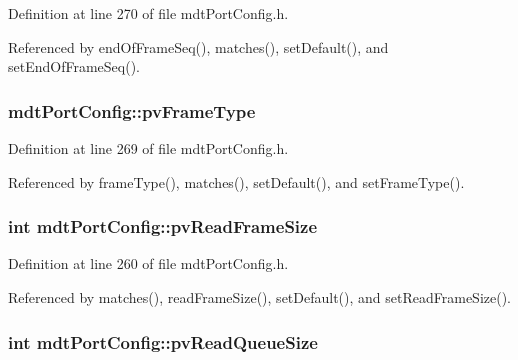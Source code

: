 Definition at line 270 of file mdt\-Port\-Config.\-h.



Referenced by end\-Of\-Frame\-Seq(), matches(), set\-Default(), and set\-End\-Of\-Frame\-Seq().

\hypertarget{classmdt_port_config_a4bc3110b7831ca76954a8d8fc78944f1}{
\subsubsection[{pv\-Frame\-Type}]{ mdt\-Port\-Config\-::pv\-Frame\-Type\hspace{0.3cm}{\ttfamily [protected]}}}\label{classmdt_port_config_a4bc3110b7831ca76954a8d8fc78944f1}


Definition at line 269 of file mdt\-Port\-Config.\-h.



Referenced by frame\-Type(), matches(), set\-Default(), and set\-Frame\-Type().

\hypertarget{classmdt_port_config_a89f0ded07219e4ddbec5f6f20a3798d5}{
\subsubsection[{pv\-Read\-Frame\-Size}]{\setlength{\rightskip}{0pt plus 5cm}int mdt\-Port\-Config\-::pv\-Read\-Frame\-Size\hspace{0.3cm}{\ttfamily [protected]}}}\label{classmdt_port_config_a89f0ded07219e4ddbec5f6f20a3798d5}


Definition at line 260 of file mdt\-Port\-Config.\-h.



Referenced by matches(), read\-Frame\-Size(), set\-Default(), and set\-Read\-Frame\-Size().

\hypertarget{classmdt_port_config_a999e392fa0d1e97428cef3d45a0f7983}{
\subsubsection[{pv\-Read\-Queue\-Size}]{\setlength{\rightskip}{0pt plus 5cm}int mdt\-Port\-Config\-::pv\-Read\-Queue\-Size\hspace{0.3cm}{\ttfamily [protected]}}}\label{classmdt_port_config_a999e392fa0d1e97428cef3d45a0f7983}


